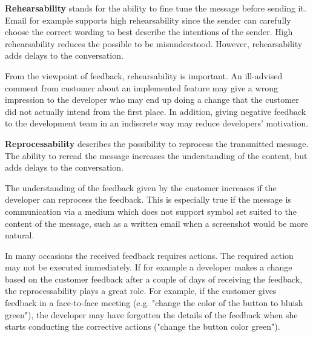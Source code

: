 \documentclass[conference]{IEEEtran}
\begin{document}
\textbf{Rehearsability} stands for the ability to fine tune the message before sending it. Email for example supports high rehearsability since the sender can carefully choose the correct wording to best describe the intentions of the sender. High rehearsability reduces the possible to be misunderstood. However, rehearsability adds delays to the conversation. \cite{2008dennis} 

From the viewpoint of feedback, rehearsability is important. An ill-advised comment from customer about an implemented feature may give a wrong impression to the developer who may end up doing a change that the customer did not actually intend from the first place. In addition, giving negative feedback to the development team in an indiscrete way may reduce developers' motivation.

\textbf{Reprocessability} describes the possibility to reprocess the transmitted message. The ability to reread the message increases the understanding of the content, but adds delays to the conversation. \cite{2008dennis}

The understanding of the feedback given by the customer increases if the developer can reprocess the feedback. This is especially true if the message is communication via a medium which does not support symbol set suited to the content of the message, such as a written email when a screenshot would be more natural. 

In many occasions the received feedback requires actions. The required action may not be executed immediately. If for example a developer makes a change based on the customer feedback after a couple of days of receiving the feedback, the reprocessability plays a great role. For example, if the customer gives feedback in a face-to-face meeting (e.g. "change the color of the button to bluish green"), the developer may have forgotten the details of the feedback when she starts conducting the corrective actions ("change the button color green").
\end{document}
